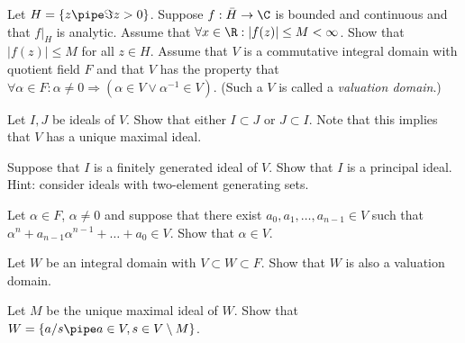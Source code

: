Let $H=\{z\pipe \Im z>0\}$. Suppose $f:\bar{H}\rightarrow \C$ is
bounded and continuous and that $f|_H$ is analytic. Assume that
$\forall x\in \R:|f(z)|\leq M<\infty$. Show that $|f(z)|\leq M$ for
all $z\in H$.
Assume that $V$ is a commutative integral domain with quotient field
$F$ and that $V$ has the property that $\forall \alpha\in F:\alpha\neq
0\Rightarrow (\alpha\in V \vee \alpha^{-1}\in V)$. (Such a $V$ is
called a \emph{valuation domain}.)
\begin{alist}
\item Let $I,J$ be ideals of $V$. Show that either $I\subset J$ or
$J\subset I$. Note that this implies that $V$ has a unique maximal
ideal.
\item Suppose that $I$ is a finitely generated ideal of $V$. Show that
$I$ is a principal ideal. Hint: consider ideals with two-element
generating sets.
\item Let $\alpha\in F$, $\alpha\neq 0$ and suppose that there exist
$a_0,a_1,\ldots ,a_{n-1}\in V$ such that
$\alpha^n+a_{n-1}\alpha^{n-1}+\ldots +a_0\in V$. Show that $\alpha\in
V$.
\item Let $W$ be an integral domain with $V\subset W\subset F$. Show
that $W$ is also a valuation domain.
\item Let $M$ be the unique maximal ideal of $W$. Show that
$W=\{a/s\pipe a\in V,s\in V\setminus M\}$.
\end{alist}


